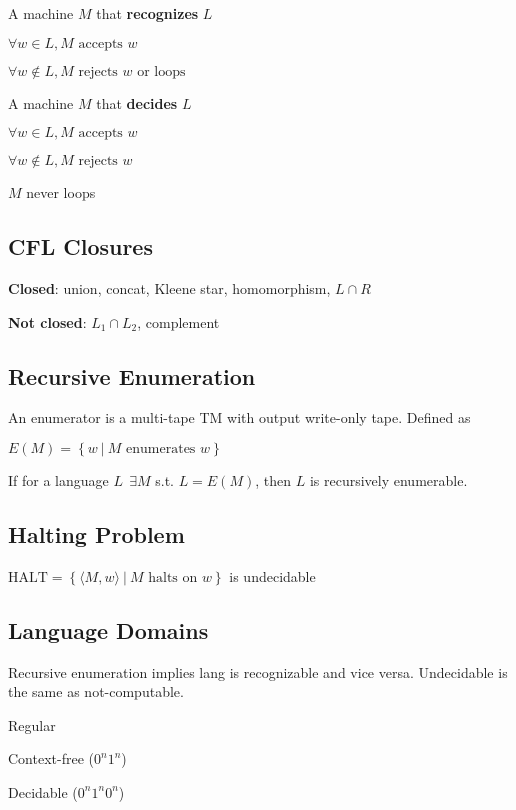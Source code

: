 A machine $M$ that \textbf{recognizes} $L$

\hspace{5mm}$\forall w \in L, M \textrm{ accepts } w$

\hspace{5mm}$\forall w \notin L, M \textrm{ rejects } w \textrm{ or loops}$

A machine $M$ that \textbf{decides} $L$

\hspace{5mm}$\forall w \in L, M \textrm{ accepts } w$

\hspace{5mm}$\forall w \notin L, M \textrm{ rejects } w$

\hspace{5mm}$M$ never loops
\subsection{CFL Closures}
\textbf{Closed}: union, concat, Kleene star, homomorphism, $L\cap R$

\textbf{Not closed}: $L_1\cap L_2$, complement
\subsection{Recursive Enumeration}
An enumerator is a multi-tape TM with output write-only tape. Defined as

$E(M) = \left\{w ~|~ M \textrm{ enumerates } w\right\}$

If for a language $L ~~\exists M$ s.t. $L = E(M)$, then $L$ is recursively
enumerable.

\subsection{Halting Problem}
$\mathrm{HALT} = \left\{\langle M, w \rangle ~|~ M \textrm{ halts on } w\right\}$
is undecidable

\subsection{Language Domains}
Recursive enumeration implies lang is recognizable and vice versa.
Undecidable is the same as not-computable.

\hspace{5mm}Regular

\hspace{10mm}Context-free ($0^n1^n$)

\hspace{15mm}Decidable ($0^n1^n0^n$)

